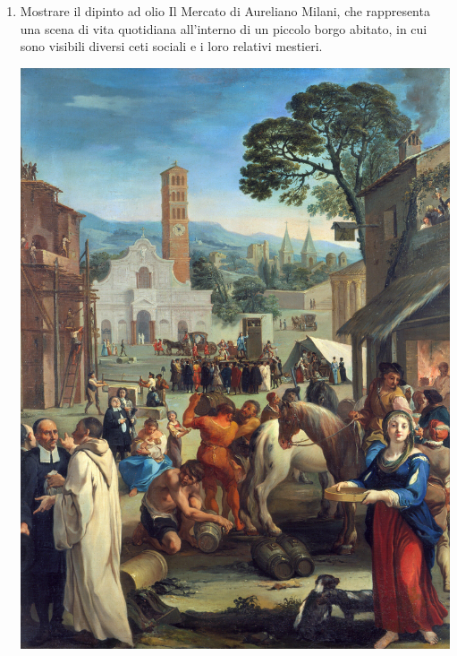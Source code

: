 \documentclass[12pt,a4paper]{article}
\begin{document}
\begin{enumerate}
	\item Mostrare il dipinto ad olio Il Mercato di Aureliano Milani, che rappresenta una scena di vita quotidiana all'interno di un piccolo borgo abitato, in cui sono visibili diversi ceti sociali e i loro relativi mestieri.\par
	\begin{minipage}{\linewidth}
		\centering
		\includegraphics[scale=0.05]{Aureliano_Milani_Mercato.jpg}
	\end{minipage}


\end{enumerate}
\end{document}
